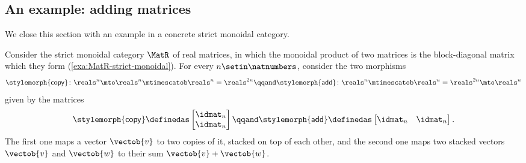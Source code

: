 \subsection{An example: adding matrices}
\label{sec:string-diagrams-example-matrices}

We close this section with an example in a concrete strict monoidal category.

\begin{example}
    \label{exa:string-diagram-matrix-sum}
    Consider the strict monoidal category $\MatR$ of real matrices, in which the monoidal product of two matrices is the block-diagonal matrix which they form (\cref{exa:MatR-strict-monoidal}).
    For every $n \setin \natnumbers$, consider the two morphisms
    \begin{equation}
        \stylemorph{\mathsf{copy}} \colon \reals^n \mto \reals^n \mtimescatob \reals^n = \reals^{2n}
        \qqand
        \stylemorph{\mathsf{add}} \colon \reals^n \mtimescatob \reals^n = \reals^{2n} \mto \reals^n
    \end{equation}
    given by the matrices
    \begin{equation}
        \stylemorph{\mathsf{copy}} \definedas
        \begin{bmatrix}
            \idmat_n \\
            \idmat_n
        \end{bmatrix}
        \qqand
        \stylemorph{\mathsf{add}} \definedas
        \begin{bmatrix}
            \idmat_n & \idmat_n
        \end{bmatrix}.
    \end{equation}
    The first one maps a vector $\vectob{v}$ to two copies of it, stacked on top of each other, and the second one maps two stacked vectors $\vectob{v}$ and $\vectob{w}$ to their sum $\vectob{v} + \vectob{w}$.


\end{example}
